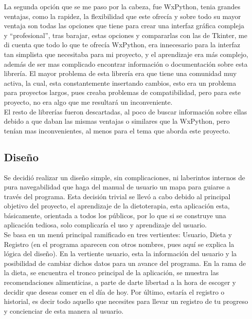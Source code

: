 La segunda opción que se me paso por la cabeza, fue WxPython,  tenia grandes ventajas, como la rapidez,  la flexibilidad que este ofrecía y sobre todo su mayor ventaja son todas las opciones que tiene para crear una interfaz gráfica compleja y “profesional”, tras barajar, estas opciones y compararlas con las de Tkinter, me di cuenta que todo lo que te ofrecía WxPython, era innecesario para la interfaz tan simplista que necesitaba para mi proyecto, y el aprendizaje era más complejo, además de ser mas complicado encontrar información o documentación sobre esta librería. El mayor problema de esta librería era que tiene una comunidad muy activa, la cual, esta constantemente insertando cambios, esto era un problema para proyectos largos, pues creaba problemas de compatibilidad, pero para este proyecto, no era algo que me resultará un inconveniente.\\

El resto de librerías fueron descartadas, al poco de buscar información sobre ellas debido a que daban las mismas ventajas o similares que la WxPython, pero tenían mas inconvenientes, al menos para el tema que aborda este proyecto.
\subsection{Diseño}
Se decidió realizar un diseño simple, sin complicaciones, ni laberintos internos de pura navegabilidad que haga del manual de usuario un mapa para guiarse a través del programa. Esta decisión trivial se llevó a cabo debido al principal objetivo del proyecto, el aprendizaje de la dietoterapia, esta aplicación esta, básicamente, orientada a todos los públicos, por lo que si se construye una aplicación tediosa, solo complicaría el uso y aprendizaje del usuario.\\

Se basa en un menú principal ramificado en tres vertientes: Usuario, Dieta y Registro (en el programa aparecen con otros nombres, pues aquí se explica la lógica del diseño). En la vertiente usuario, esta la información del usuario y la posibilidad de cambiar dichos datos para un avance del programa. En la rama de la dieta, se encuentra el tronco principal de la aplicación, se muestra las recomendaciones alimenticias, a parte de darte libertad a la hora de escoger y decidir que deseas comer en el día de hoy. Por último, estaría el registro o historial, es decir todo aquello que necesites para llevar un registro de tu progreso y concienciar de esta manera al usuario.\\

